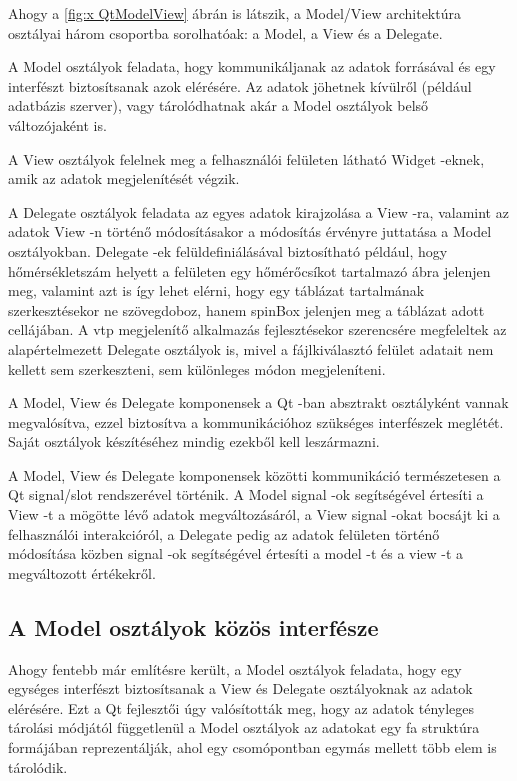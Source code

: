 Ahogy a \ref{fig:x QtModelView} ábrán is látszik, 
a Model/View architektúra osztályai három csoportba sorolhatóak:
a Model, a View és a Delegate.

A Model osztályok feladata, 
hogy kommunikáljanak az adatok forrásával
és egy interfészt biztosítsanak azok elérésére. 
Az adatok jöhetnek kívülről (például adatbázis szerver), 
vagy tárolódhatnak akár a Model osztályok belső változójaként is. 

A View osztályok felelnek meg 
a felhasználói felületen látható Widget -eknek, 
amik az adatok megjelenítését végzik. 

A Delegate osztályok feladata az egyes adatok kirajzolása a View -ra, 
valamint az adatok View -n történő módosításakor 
a módosítás érvényre juttatása a Model osztályokban.
Delegate -ek felüldefiniálásával biztosítható például, 	
hogy hőmérsékletszám helyett a felületen egy hőmérőcsíkot tartalmazó ábra jelenjen meg, 	
valamint azt is így lehet elérni, hogy
egy táblázat tartalmának szerkesztésekor ne szövegdoboz,       	
hanem spinBox jelenjen meg a táblázat adott cellájában.
A vtp megjelenítő alkalmazás fejlesztésekor szerencsére megfeleltek 
az alapértelmezett Delegate osztályok is, 
mivel a fájlkiválasztó felület adatait nem kellett sem szerkeszteni, 
sem különleges módon megjeleníteni. 

A Model, View és Delegate komponensek 
a Qt -ban absztrakt osztályként vannak megvalósítva, 
ezzel biztosítva a kommunikációhoz szükséges interfészek meglétét. 
Saját osztályok készítéséhez mindig ezekből kell leszármazni.

A Model, View és Delegate komponensek közötti kommunikáció természetesen 
a Qt signal/slot rendszerével történik. 
A Model signal -ok segítségével értesíti 
a View -t a mögötte lévő adatok megváltozásáról, 
a View signal -okat bocsájt ki a felhasználói interakcióról, 
a Delegate pedig az adatok felületen történő módosítása 
közben signal -ok segítségével értesíti a model -t és a view -t 
a megváltozott értékekről. 

\subsection{A Model osztályok közös interfésze}

Ahogy fentebb már említésre került, 
a Model osztályok feladata, 
hogy egy egységes interfészt biztosítsanak 
a View és Delegate osztályoknak az adatok elérésére. 
Ezt a Qt fejlesztői úgy valósították meg,
hogy az adatok tényleges tárolási módjától függetlenül 
a Model osztályok az adatokat egy fa struktúra formájában reprezentálják, 
ahol egy csomópontban egymás mellett több elem is tárolódik. 

